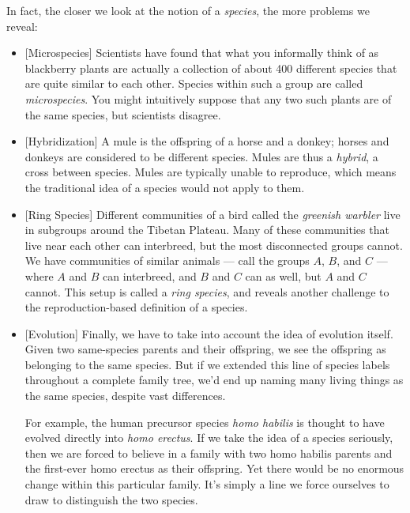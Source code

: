 \documentclass[11pt, oneside]{article}
\begin{document}
In fact, the closer we look at the notion of a {\em species}, the more problems
we reveal:
\begin{itemize}
    \item{} [Microspecies] Scientists have found that what you informally
        think of as blackberry plants are actually a
        collection of about 400
        different species that are quite similar to each other.
        Species within such a group are called {\em microspecies}.
        You might intuitively
        suppose that any two such plants are of the same species,
        but scientists disagree.
    \item{} [Hybridization] A mule is the offspring of a horse and a donkey;
        horses and donkeys are considered to be different species.
        Mules are thus a {\em hybrid}, a cross between species.
        Mules
        are typically unable to reproduce, which means the
        traditional idea of a species would not apply to them.
    \item{} [Ring Species] Different communities of a bird called the
        {\em greenish warbler} live in subgroups around the Tibetan Plateau.
        Many of these communities that live near each other can interbreed, but
        the most disconnected groups cannot. We have
        communities of similar animals --- call the groups $A$, $B$, and $C$ ---
        where $A$ and $B$ can interbreed, and $B$ and $C$ can as well, but $A$
        and $C$ cannot. This setup is called a {\em ring species}, and reveals
        another challenge to the reproduction-based definition of a species.
    \item{} [Evolution] Finally, we have to take into account the idea of
        evolution itself.
        Given two same-species parents and their offspring, we see the
        offspring as belonging to the same species.
        But if we extended this line of
        species labels throughout a complete family tree, we'd end up naming
        many living things as the same species, despite vast differences.

        For example, the human precursor species {\em homo habilis} is
        thought to have evolved directly into {\em homo erectus}.
        If we take the idea of a species seriously,
        then we are forced to believe in a family
        with two homo habilis parents and
        the first-ever homo erectus as their offspring.
        Yet there would be no enormous
        change within this particular family.
        It's simply a line we force
        ourselves to draw to distinguish the two species.
\end{itemize}
\end{document}
